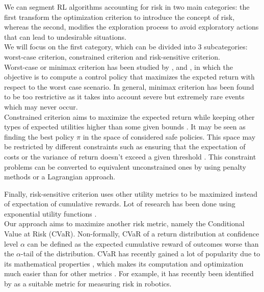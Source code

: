 We can segment RL algorithms accounting for risk in two main categories: the first transform 
the optimization criterion to introduce the concept of risk, whereas the second, modifies
the exploration process to avoid exploratory actions that can lead to undesirable situations.\\
We will focus on the first category, which can be divided into 3 subcategories: worst-case
criterion, constrained criterion and risk-sensitive criterion.\\
Worst-case or minimax criterion has been studied by \citet{Heger1994}, 
\citet{Coraluppi1997} and \citet{Coraluppi1999},
in which the objective is to compute a control policy that maximizes the expcted return
with respect to the worst case scenario. In general, minimax criterion has
been found to be too restrictive as it takes into
account severe but extremely rare events which may never occur.\\
Constrained criterion  aims to maximize the expected return while keeping
other types of expected utilities higher than some given bounds \citep{Altman1993}.
It may be seen as finding the best policy $\pi$ in the space of considered safe policies.
This space may be restricted by different constraints such as ensuring that
the expectation of costs \citep{Geibel2006} or the variance of return doesn't exceed
a given threshold \citep{Tamar2012}.
This constraint problems can be converted to equivalent unconstrained ones by using
penalty methods or a Lagrangian approach.

Finally, risk-sensitive criterion uses other utility metrics to be maximized instead of
expectation of cumulative rewards.
Lot of research has been done using exponential utility functions
\citep{Howard1972,Chung1987}.\\
Our approach aims to maximize
another risk metric, namely the Conditional Value at Risk (CVaR).
Non-formally, CVaR of a return distribution at confidence level $\alpha$ can be defined as the expected
cumulative reward of outcomes worse than the $\alpha$-tail of the distribution.
CVaR has recently gained a lot of popularity due to its mathematical properties \citep{Artzner1999},
which makes its computation and optimization much easier than for other metrics  \citep{Rockafellar2000}.
For example, 
it has recently been identified by \citet{Majumdar2020} as a suitable metric
for measuring risk in robotics.


